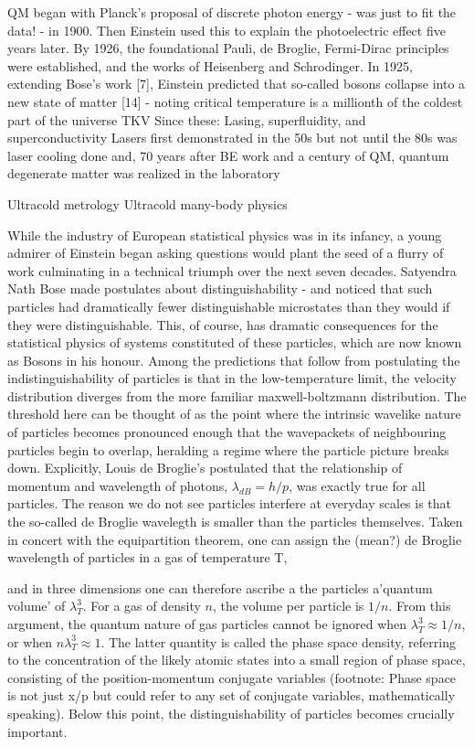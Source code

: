 QM began with Planck's proposal of discrete photon energy - was just to fit the data! - in 1900. Then Einstein used this to explain the photoelectric effect five years later. By 1926, the foundational Pauli, de Broglie, Fermi-Dirac principles were established, and the works of Heisenberg and Schrodinger. 
	In 1925, extending Bose's work [7], Einstein predicted that so-called bosons collapse into a new state of matter [14] - noting critical temperature is a millionth of the coldest part of the universe TKV
	Since these: Lasing, superfluidity, and superconductivity 
	Lasers first demonstrated in the 50s but not until the 80s was laser cooling done and, 70 years after BE work and a century of QM, quantum degenerate matter was realized in the laboratory
	
Ultracold metrology Ultracold many-body physics


While the industry of European statistical physics was in its infancy, a	young admirer of Einstein began asking questions would plant the seed of	a flurry of work culminating in a technical triumph over the next seven	decades. Satyendra Nath Bose made postulates about distinguishability -	and noticed that such particles had dramatically fewer distinguishable	microstates than they would if they were distinguishable. This, of	course, has dramatic consequences for the statistical physics of systems	constituted of these particles, which are now known as Bosons in his	honour. Among the predictions that follow from postulating the	indistinguishability of particles is that in the low-temperature limit,	the velocity distribution diverges from the more familiar	maxwell-boltzmann distribution. The threshold here can be thought of as	the point where the intrinsic wavelike nature of particles becomes	pronounced enough that the wavepackets of neighbouring particles begin	to overlap, heralding a regime where the particle picture breaks down.	Explicitly, Louis de Broglie's postulated that the relationship of	momentum and wavelength of photons, $\lambda_{dB} = h/p$, was exactly	true for all particles. The reason we do not see particles interfere at	everyday scales is that the so-called de Broglie wavelegth is smaller	than the particles themselves. Taken in concert with the equipartition	theorem, one can assign the (mean?) de Broglie wavelength of particles	in a gas of temperature T,


	and in three dimensions one can therefore ascribe a the particles	a'quantum volume' of $\lambda_T^3$. For a gas of density $n$, the	volume per particle is $1/n$. From this argument, the quantum nature	of gas particles cannot be ignored when $\lambda_T^3 \approx 1/n$,	or when $n\lambda_T^3\approx 1$. The latter quantity is called the	phase space density, referring to the concentration of the likely atomic	states into a small region of phase space, consisting of the	position-momentum conjugate variables (footnote: Phase space is not just	x/p but could refer to any set of conjugate variables, mathematically	speaking). Below this point, the distinguishability of particles becomes	crucially important.

